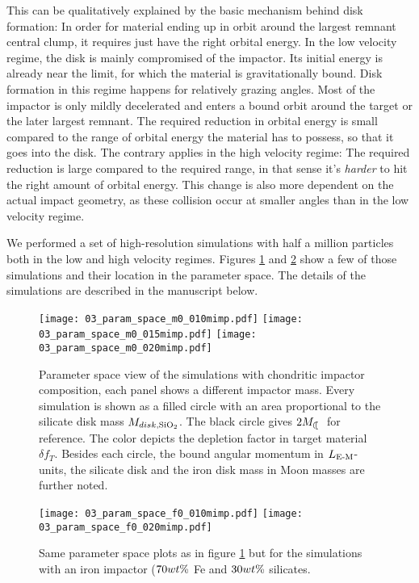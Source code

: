 This can be qualitatively explained by the basic mechanism behind disk formation: In order for material ending up in orbit around the largest remnant central clump, it requires just have the right orbital energy. In the low velocity regime, the disk is mainly compromised of the impactor. Its initial energy is already near the limit, for which the material is gravitationally bound. Disk formation in this regime happens for relatively grazing angles. Most of the impactor is only mildly decelerated and enters a bound orbit around the target or the later largest remnant. The required reduction in orbital energy is small compared to the range of orbital energy the material has to possess, so that it goes into the disk. The contrary applies in the high velocity regime: The required reduction is large compared to the required range, in that sense it's \emph{harder} to hit the right amount of orbital energy. This change is also more dependent on the actual impact geometry, as these collision occur at smaller angles than in the low velocity regime.

We performed a set of high-resolution simulations with half a million particles both in the low and high velocity regimes. Figures \ref{ch05_fig03a} and \ref{ch05_fig03b} show a few of those simulations and their location in the parameter space. The details of the simulations are described in the manuscript below. 

\begin{figure}
\begin{center}
\texttt{[image: 03\_param\_space\_m0\_010mimp.pdf]}
\texttt{[image: 03\_param\_space\_m0\_015mimp.pdf]}
\texttt{[image: 03\_param\_space\_m0\_020mimp.pdf]}
\caption{Parameter space view of the simulations with chondritic impactor composition, each panel shows a different impactor mass. Every simulation is shown as a filled circle with an area proportional to the silicate disk mass $M_{disk, \mathrm{SiO}_2}$. The black circle gives $2 \ML$ for reference. The color depicts the depletion factor in target material $\delta f_T$. Besides each circle, the bound angular momentum in $L_{\textrm{E-M}}$-units, the silicate disk and the iron disk mass in Moon masses are further noted.}
\label{ch05_fig03a}
\end{center}
\end{figure}

\begin{figure}
\begin{center}
\texttt{[image: 03\_param\_space\_f0\_010mimp.pdf]}
\texttt{[image: 03\_param\_space\_f0\_020mimp.pdf]}
\caption{Same parameter space plots as in figure \ref{ch05_fig03a} but for the simulations with an iron impactor ($70 wt\mathrm{\%}$ Fe and $30 wt\mathrm{\%}$ silicates.}
\label{ch05_fig03b}
\end{center}
\end{figure}




